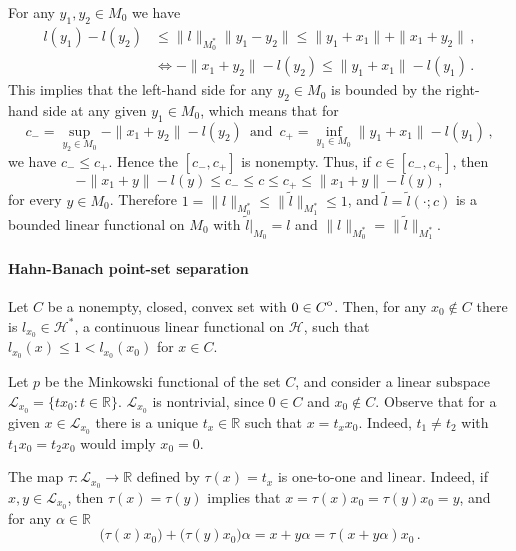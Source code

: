 \documentclass[a4paper]{article}
\newcommand{\Hcal}{\mathcal{H}}
\newcommand{\real}{\mathbb{R}}
\newcommand{\interior}[1]{%
  {\kern0pt#1}^{\mathrm{o}}%
}
\newcommand{\Lcal}{\mathcal{L}}
\begin{document}
For any $y_1, y_2 \in M_0$ we have
\begin{align*}
  l(y_1) - l(y_2)
    &\leq \|l\|_{M_0^*} \|y_1 - y_2\|
    \leq \|y_1 + x_1 \| + \|x_1 + y_2\|
    \,, \\
  &\Leftrightarrow
  - \|x_1 + y_2\| - l(y_2)
    \leq \|y_1 + x_1 \| - l(y_1)
    \,.
\end{align*}
This implies that the left-hand side for any $y_2\in M_0$ is bounded by the right-%
hand side at any given $y_1\in M_0$, which means that for
\begin{equation*}
  c_-
    = \sup_{y_2\in M_0} - \|x_1 + y_2\| - l(y_2)
    \,\text{ and }\,
    c_+ = \inf_{y_1\in M_0} \|y_1 + x_1 \| - l(y_1)
    \,,
\end{equation*}
we have $c_- \leq c_+$. Hence the $[c_-, c_+]$ is nonempty. Thus, if $c\in [c_-, c_+]$,
then
\begin{equation*}
  - \|x_1 + y\| - l(y) \leq c_- \leq c \leq c_+ \leq \|x_1 + y\| - l(y)
    \,,
\end{equation*}
for every $y \in M_0$. Therefore $1 = \|l\|_{M_0^*} \leq \|\tilde{l}\|_{M_1^*} \leq 1$, 
and $\tilde{l} = \tilde{l}(\cdot; c)$ is a bounded linear functional on $M_0$ with
$\tilde{l}\big\vert_{M_0} = l$ and $\|l\|_{M_0^*}=\|\tilde{l}\|_{M_1^*}$.




\paragraph{Hahn-Banach point-set separation} %
\label{par:hahn_banach_point_set_separation}

Let $C$ be a nonempty, closed, convex set with $0\in \interior{C}$. Then, for any
$x_0\notin C$ there is $l_{x_0} \in \Hcal^*$, a continuous linear functional on
$\Hcal$, such that $l_{x_0}(x) \leq 1 < l_{x_0}(x_0)$ for $x\in C$.

Let $p$ be the Minkowski functional of the set $C$, and consider a linear subspace
$\Lcal_{x_0} = \{t x_0\colon t\in \real\}$. $\Lcal_{x_0}$ is nontrivial, since $0\in C$
and $x_0\notin C$. Observe that for a given $x\in \Lcal_{x_0}$ there is a unique
$t_x \in \real$ such that $x = t_x x_0$. Indeed, $t_1\neq t_2$ with $t_1 x_0 = t_2 x_0$
would imply $x_0 = 0$.

The map $\tau\colon \Lcal_{x_0} \to \real$ defined by $\tau(x) = t_x$ is one-to-one
and linear. Indeed, if $x, y\in \Lcal_{x_0}$, then $\tau(x) = \tau(y)$ implies that
$x = \tau(x) x_0 = \tau(y) x_0 = y$, and for any $\alpha\in \real$
\begin{equation}
  \bigl( \tau(x) x_0 \bigr) + \bigl( \tau(y) x_0 \bigr) \alpha
    = x + y \alpha
    = \tau(x + y \alpha) x_0
  \,.
\end{equation}
\end{document}
